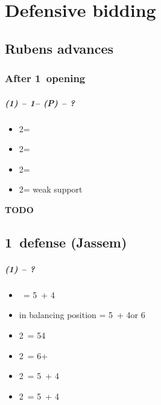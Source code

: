 \documentclass[12pt, a4paper]{report}
\begin{document}
\part*{\colorbox{RoyalPurple!30}{Defensive bidding}}
 {
    
    \chapter*{\colorbox{Plum!30}{Rubens advances}}
     {
        \section*{\colorbox{blue!30}{After 1\clubs\ opening}}
         {

            \subsubsection*{(1\clubs) -- 1\spades -- (P) -- ?}
            \begin{itemize}
                \item 2\clubs = \trsf{\diams}
                \item 2\diams = \trsf{\hearts}
                \item 2\hearts = \trsf{\spades}
                \item 2\spades = weak support
            \end{itemize}
        }

        {\color{red}\textbf{TODO}}
    }

    \chapter*{\colorbox{Plum!30}{1\ntx\ defense (Jassem)}}
     {
        \subsubsection*{(1\ntx) -- ?}
        \begin{itemize}
            \item \dbl\ = 5\minor\ + 4\major
            \item \dbl in balancing position = 5\minor\ + 4\major or 6\minor
            \item 2\clubs\ = 54 \major
            \item 2\diams\ = 6+ \major
            \item 2\hearts\ = 5\hearts\ + 4\minor
            \item 2\spades\ = 5\spades\ + 4\minor
        \end{itemize}

}}
\end{document}
